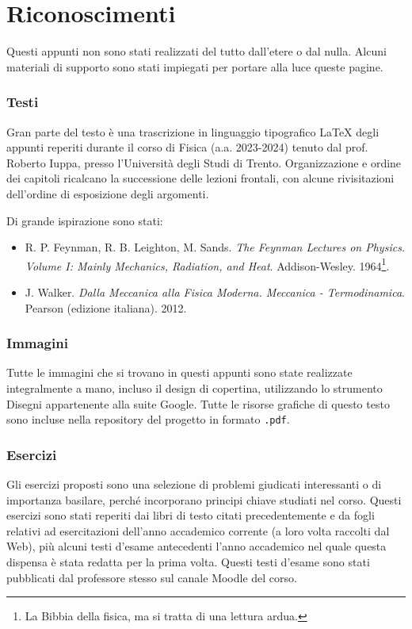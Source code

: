 \section*{Riconoscimenti}
Questi appunti non sono stati realizzati del tutto dall'etere o dal nulla.
Alcuni materiali di supporto sono stati impiegati per portare alla luce
queste pagine.

\subsubsection*{Testi}
Gran parte del testo è una trascrizione in linguaggio tipografico \LaTeX\@
degli appunti reperiti durante
il corso di Fisica (a.a. 2023-2024) tenuto dal prof. Roberto Iuppa, presso
l'Università degli Studi di Trento. Organizzazione e ordine dei
capitoli ricalcano la successione delle lezioni frontali, con alcune
rivisitazioni dell'ordine di esposizione degli argomenti.

Di grande ispirazione sono stati:
\begin{itemize}
    \item R. P. Feynman, R. B. Leighton, M. Sands. \textit{The Feynman Lectures on Physics. Volume I: Mainly Mechanics, Radiation, and Heat}. Addison-Wesley. 1964\footnote{La Bibbia della fisica, ma si tratta di una lettura ardua.}.
    \item J. Walker. \textit{Dalla Meccanica alla Fisica Moderna. Meccanica - Termodinamica}. Pearson (edizione italiana). 2012.
\end{itemize}

\subsubsection*{Immagini}
Tutte le immagini che si trovano in questi appunti sono state realizzate
integralmente a mano, incluso il design di copertina, utilizzando
lo strumento Disegni appartenente alla suite Google. Tutte le risorse
grafiche di questo testo sono incluse nella repository del progetto in
formato \texttt{.pdf}.

\subsubsection*{Esercizi}
Gli esercizi proposti sono una selezione di problemi
giudicati interessanti o
di importanza basilare, perché incorporano principi chiave studiati nel corso.
Questi esercizi sono stati reperiti dai libri di testo citati precedentemente
e da fogli relativi ad esercitazioni dell'anno accademico corrente (a loro
volta raccolti dal Web), più alcuni testi d'esame antecedenti l'anno accademico
nel quale questa dispensa è stata redatta per la prima volta. Questi testi
d'esame sono stati pubblicati dal professore stesso sul canale Moodle del corso.